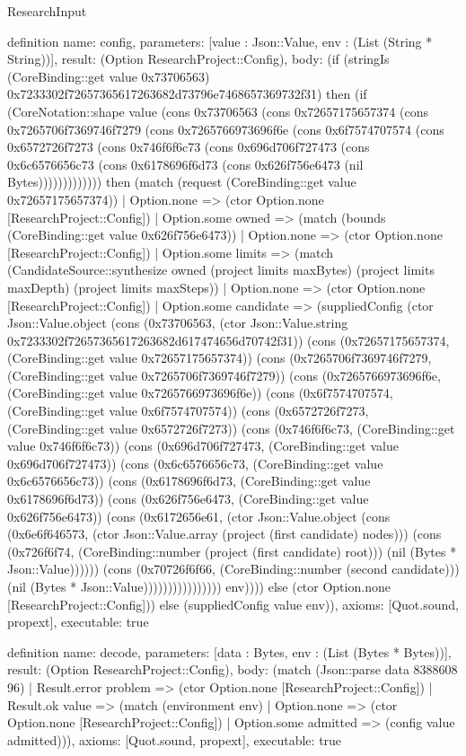 \begin{lexlean}{ResearchInput}
\begin{semanticmodule}
definition{
 name: config,
 parameters: [value : Json::Value, env : (List (String * String))],
 result: (Option ResearchProject::Config),
 body: (if (stringIs (CoreBinding::get value 0x73706563) 0x7233302f72657365617263682d73796e7468657369732f31) then (if (CoreNotation::shape value (cons 0x73706563 (cons 0x72657175657374 (cons 0x7265706f7369746f7279 (cons 0x7265766973696f6e (cons 0x6f7574707574 (cons 0x6572726f7273 (cons 0x746f6f6c73 (cons 0x696d706f727473 (cons 0x6c6576656c73 (cons 0x6178696f6d73 (cons 0x626f756e6473 (nil Bytes))))))))))))) then (match (request (CoreBinding::get value 0x72657175657374)) | Option.none => (ctor Option.none [ResearchProject::Config]) | Option.some owned => (match (bounds (CoreBinding::get value 0x626f756e6473)) | Option.none => (ctor Option.none [ResearchProject::Config]) | Option.some limits => (match (CandidateSource::synthesize owned (project limits maxBytes) (project limits maxDepth) (project limits maxSteps)) | Option.none => (ctor Option.none [ResearchProject::Config]) | Option.some candidate => (suppliedConfig (ctor Json::Value.object (cons (0x73706563, (ctor Json::Value.string 0x7233302f72657365617263682d617474656d70742f31)) (cons (0x72657175657374, (CoreBinding::get value 0x72657175657374)) (cons (0x7265706f7369746f7279, (CoreBinding::get value 0x7265706f7369746f7279)) (cons (0x7265766973696f6e, (CoreBinding::get value 0x7265766973696f6e)) (cons (0x6f7574707574, (CoreBinding::get value 0x6f7574707574)) (cons (0x6572726f7273, (CoreBinding::get value 0x6572726f7273)) (cons (0x746f6f6c73, (CoreBinding::get value 0x746f6f6c73)) (cons (0x696d706f727473, (CoreBinding::get value 0x696d706f727473)) (cons (0x6c6576656c73, (CoreBinding::get value 0x6c6576656c73)) (cons (0x6178696f6d73, (CoreBinding::get value 0x6178696f6d73)) (cons (0x626f756e6473, (CoreBinding::get value 0x626f756e6473)) (cons (0x6172656e61, (ctor Json::Value.object (cons (0x6e6f646573, (ctor Json::Value.array (project (first candidate) nodes))) (cons (0x726f6f74, (CoreBinding::number (project (first candidate) root))) (nil (Bytes * Json::Value)))))) (cons (0x70726f6f66, (CoreBinding::number (second candidate))) (nil (Bytes * Json::Value)))))))))))))))) env)))) else (ctor Option.none [ResearchProject::Config])) else (suppliedConfig value env)),
 axioms: [Quot.sound, propext],
 executable: true
}

definition{
 name: decode,
 parameters: [data : Bytes, env : (List (Bytes * Bytes))],
 result: (Option ResearchProject::Config),
 body: (match (Json::parse data 8388608 96) | Result.error problem => (ctor Option.none [ResearchProject::Config]) | Result.ok value => (match (environment env) | Option.none => (ctor Option.none [ResearchProject::Config]) | Option.some admitted => (config value admitted))),
 axioms: [Quot.sound, propext],
 executable: true
}


\end{semanticmodule}
\end{lexlean}
